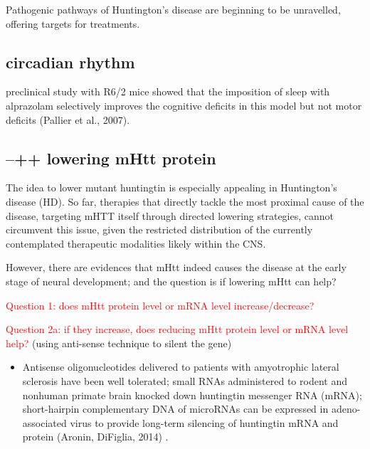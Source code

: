 Pathogenic pathways of Huntington's disease are beginning to be unravelled,
offering targets for treatments.


% 


\subsection{circadian rhythm}

preclinical study with R6/2 mice showed that the imposition of sleep with
alprazolam selectively improves the cognitive deficits in this model but not
motor deficits (Pallier et al., 2007).




\subsection{--++ lowering mHtt protein}
\label{sec:HD-theory-lowering-mHtt}

The idea to lower mutant huntingtin is especially appealing in Huntington's
disease (HD). So far, therapies that directly tackle the most proximal cause of
the disease, targeting mHTT itself through directed lowering strategies, cannot
circumvent this issue, given the restricted distribution of the currently
contemplated therapeutic modalities likely within the CNS.

However, there are evidences that mHtt indeed causes the disease at the early
stage of neural development; and the question is if lowering mHtt can help?

\textcolor{red}{Question 1: does mHtt protein level or mRNA level
increase/decrease?}

\textcolor{red}{Question 2a: if they increase, does reducing mHtt protein level
or mRNA level help?} (using anti-sense technique to silent the gene)
\begin{itemize}
  \item  Antisense oligonucleotides delivered to patients with amyotrophic lateral
sclerosis have been well tolerated; small RNAs administered to rodent and
nonhuman primate brain knocked down huntingtin messenger RNA (mRNA);
short-hairpin complementary DNA of microRNAs can be expressed in
adeno-associated virus to provide long-term silencing of huntingtin mRNA and
protein (Aronin, DiFiglia, 2014) .
  
\end{itemize}

